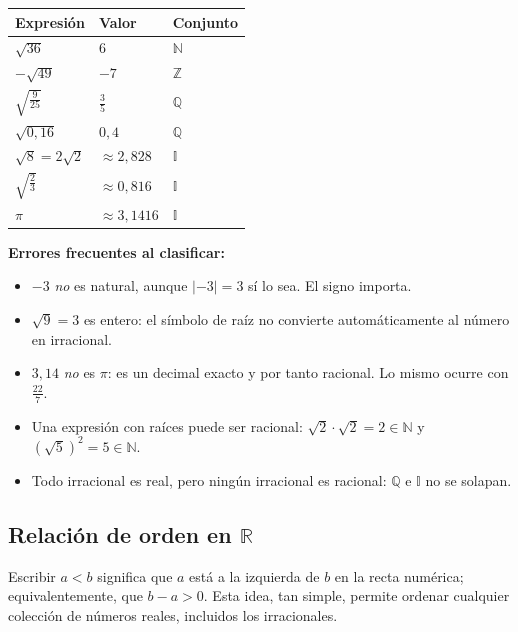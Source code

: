 \documentclass[12pt, letterpaper]{article}
\begin{document}
\begin{center}
  \renewcommand{\arraystretch}{1.3}
  \begin{tabular}{@{}lll@{}}
    \toprule
    \textbf{Expresión} & \textbf{Valor} & \textbf{Conjunto} \\
    \midrule
    $\sqrt{36}$ & $6$ & $\mathbb{N}$ \\
    $-\sqrt{49}$ & $-7$ & $\mathbb{Z}$ \\
    $\sqrt{\frac{9}{25}}$ & $\frac{3}{5}$ & $\mathbb{Q}$ \\
    $\sqrt{0{,}16}$ & $0{,}4$ & $\mathbb{Q}$ \\
    $\sqrt{8} = 2\sqrt{2}$ & $\approx 2{,}828$ & $\mathbb{I}$ \\
    $\sqrt{\frac{2}{3}}$ & $\approx 0{,}816$ & $\mathbb{I}$ \\
    $\pi$ & $\approx 3{,}1416$ & $\mathbb{I}$ \\
    \bottomrule
  \end{tabular}
\end{center}

\begin{cuadroadvertencia}
  \textbf{Errores frecuentes al clasificar:}
  \begin{itemize}[leftmargin=*]
    \item $-3$ \emph{no} es natural, aunque $|-3| = 3$ sí lo sea. El signo importa.
    \item $\sqrt{9} = 3$ es entero: el símbolo de raíz no convierte automáticamente al número en irracional.
    \item $3{,}14$ \emph{no} es $\pi$: es un decimal exacto y por tanto racional. Lo mismo ocurre con $\frac{22}{7}$.
    \item Una expresión con raíces puede ser racional: $\sqrt{2} \cdot \sqrt{2} = 2 \in \mathbb{N}$ y $(\sqrt{5})^2 = 5 \in \mathbb{N}$.
    \item Todo irracional es real, pero ningún irracional es racional: $\mathbb{Q}$ e $\mathbb{I}$ no se solapan.
  \end{itemize}
\end{cuadroadvertencia}

\subsection{Relación de orden en $\mathbb{R}$}

Escribir $a < b$ significa que $a$ está a la izquierda de $b$ en la recta numérica; equivalentemente, que $b - a > 0$. Esta idea, tan simple, permite ordenar cualquier colección de números reales, incluidos los irracionales.
\end{document}
